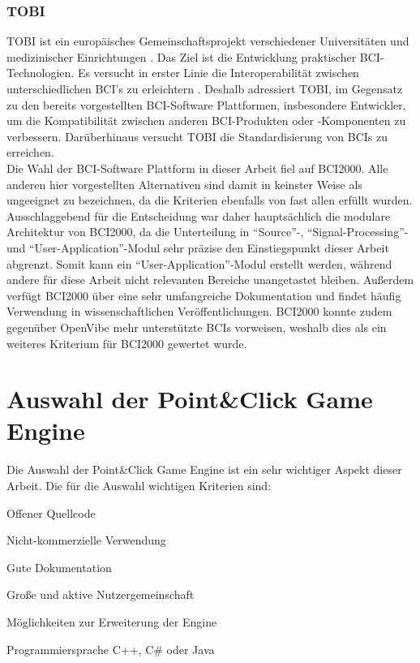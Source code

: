 \subsubsection{TOBI}
\ac{TOBI} ist ein europäisches Gemeinschaftsprojekt verschiedener Universitäten und medizinischer Einrichtungen \cite{TOBIOnline}.
Das Ziel ist die Entwicklung praktischer \acs{BCI}-Technologien. 
Es versucht in erster Linie die Interoperabilität zwischen unterschiedlichen \acs{BCI}'s zu erleichtern \cite{BCIPlatforms}.
Deshalb adres\-siert \acs{TOBI}, im Gegensatz zu den bereits vorgestellten BCI-Software Plattformen, insbesondere Entwickler, um die Kompatibilität zwischen anderen \acs{BCI}-Produkten oder -Komponenten zu verbessern.
Darüberhinaus versucht \acs{TOBI} die Standardisierung von BCIs zu erreichen.\\


Die Wahl der BCI-Software Plattform in dieser Arbeit fiel auf BCI2000.
Alle anderen hier vorgestellten Alternativen sind damit in keinster Weise als ungeeignet zu bezeichnen, da die Kriterien ebenfalls von fast allen erfüllt wurden.
Ausschlaggebend für die Entscheidung war daher hauptsächlich die modulare Architektur von BCI2000, 
da die Unterteilung in "`Source"'-, "`Signal-Processing"'- und "`User-Application"'-Modul sehr präzise den Einstiegspunkt dieser Arbeit abgrenzt.
Somit kann ein "`User-Application"'-Modul erstellt werden, während andere für diese Arbeit nicht relevanten Bereiche unangetastet bleiben.
Außerdem verfügt BCI2000 über eine sehr umfangreiche Dokumentation und findet häufig Verwendung in wissenschaftlichen Veröffentlichungen.
BCI2000 konnte zudem gegenüber OpenVibe mehr unterstützte BCIs vorweisen, weshalb dies als ein weiteres Kriterium für BCI2000 gewertet wurde.\\




\pagebreak
\section{Auswahl der Point\&Click Game Engine}
Die Auswahl der Point\&Click Game Engine ist ein sehr wichtiger Aspekt dieser Arbeit. 
Die für die Auswahl wichtigen Kriterien sind:

\begin{itemize}
\setlength{\itemsep}{0pt}
\footnotesize
{
\item Offener Quellcode
\item Nicht-kommerzielle Verwendung
\item Gute Dokumentation
\item Große und aktive Nutzergemeinschaft
\item Möglichkeiten zur Erweiterung der Engine
\item Programmiersprache C++, C\# oder Java\\
}
\end{itemize}


